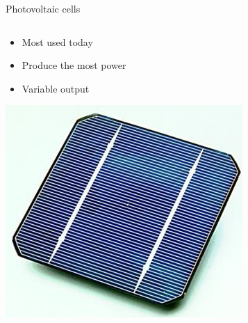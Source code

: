 \documentclass{beamer}
\begin{document}
\begin{frame}{Photovoltaic cells}
 \begin{columns}
  

  \begin{column}{.5\textwidth}
    \begin{itemize}
      \item Most used today
      \item Produce the most power
      \item Variable output
    \end{itemize}
    \includegraphics[width=\textwidth]{./Slike/Solar_cell}
  \end{column}
  \begin{column}{.4\textwidth}

\end{column}
\end{columns}
\end{frame}
\end{document}
